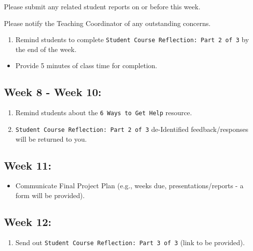 \documentclass[
]{book}
\providecommand{\tightlist}{%
  \setlength{\itemsep}{0pt}\setlength{\parskip}{0pt}}
\begin{document}
Please submit any related student reports on or before this week.

Please notify the Teaching Coordinator of any outstanding concerns.

\begin{enumerate}
\def\labelenumi{\arabic{enumi})}
\setcounter{enumi}{2}
\tightlist
\item
  Remind students to complete \texttt{Student\ Course\ Reflection:\ Part\ 2\ of\ 3} by the end of the week.
\end{enumerate}

\begin{itemize}
\tightlist
\item
  Provide 5 minutes of class time for completion.
\end{itemize}

\hypertarget{week-8---week-10}{%
\subsection{Week 8 - Week 10:}\label{week-8---week-10}}

\begin{enumerate}
\def\labelenumi{\arabic{enumi})}
\item
  Remind students about the \texttt{6\ Ways\ to\ Get\ Help} resource.
\item
  \texttt{Student\ Course\ Reflection:\ Part\ 2\ of\ 3} de-Identified feedback/responses will be returned to you.
\end{enumerate}

\hypertarget{week-11}{%
\subsection{Week 11:}\label{week-11}}

\begin{itemize}
\tightlist
\item
  Communicate Final Project Plan (e.g., weeks due, presentations/reports - a form will be provided).
\end{itemize}

\hypertarget{week-12}{%
\subsection{Week 12:}\label{week-12}}

\begin{enumerate}
\def\labelenumi{\arabic{enumi})}
\tightlist
\item
  Send out \texttt{Student\ Course\ Reflection:\ Part\ 3\ of\ 3} (link to be provided).
\end{enumerate}
\end{document}
